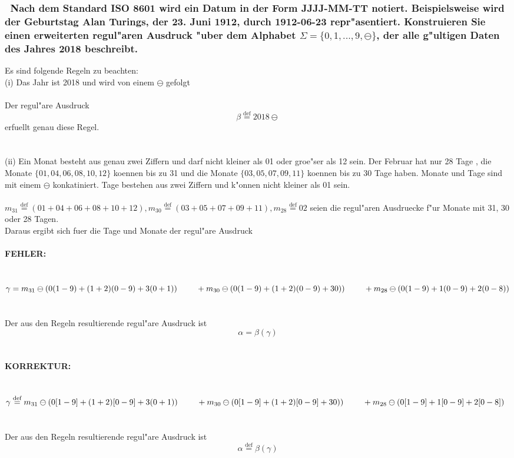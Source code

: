 \documentclass{article}
\newcommand{\tab}{\null\ \qquad}
\newcommand{\gap}{\null\ \\ \\}
\newcommand{\task}[1]{\textbf{#1} \\ \gap}
\newcommand{\error}{\task{FEHLER:}}
\newcommand{\correction}{\task{KORREKTUR:}}
\newcommand{\mdef}{\overset{\text{def}}{=}}
\begin{document}
\subsubsection{\
    Nach dem Standard ISO 8601 wird ein Datum in der Form JJJJ-MM-TT notiert.
        Beispielsweise wird der Geburtstag Alan Turings, der 23. Juni 1912, 
        durch 1912-06-23 repr"asentiert. Konstruieren Sie einen erweiterten 
        regul"aren Ausdruck "uber dem Alphabet $\Sigma = \{0,1,...,9, \ominus\}$,
        der alle g"ultigen Daten des Jahres 2018 beschreibt.
    }
Es sind folgende Regeln zu beachten:\\
(i) Das Jahr ist 2018 und wird von einem $\ominus$ gefolgt\\
\\
Der regul"are Ausdruck\[
    \beta \mdef 2018 \ominus
    \]
erfuellt genau diese Regel.\\
\gap
(ii) Ein Monat besteht aus genau zwei Ziffern und darf nicht kleiner als 01 oder
    groe"ser als 12 sein. Der Februar hat nur 28 Tage
    , die Monate $\{01,04,06,08,10,12\}$ koennen bis zu 31 
    und die Monate $\{03,05,07,09,11\}$ koennen bis zu 30 Tage haben.
    Monate und Tage sind mit einem $\ominus$ konkatiniert.
    Tage bestehen aus zwei Ziffern und k"onnen nicht kleiner als 01 sein.\\
\\
$m_{31} \mdef (01+04+06+08+10+12)
    , m_{30} \mdef (03+05+07+09+11)
    , m_{28} \mdef 02$ 
    seien die regul"aren Ausdruecke f"ur Monate mit 31, 30 oder 28 Tagen.\\
Daraus ergibt sich fuer die Tage und Monate der regul"are Ausdruck\\
\\
\error
$\gamma = m_{31} \ominus (0(1-9)+(1+2)(0-9)+3(0+1))\\
    \tab + m_{30} \ominus (0(1-9)+(1+2)(0-9)+30))\\
    \tab + m_{28} \ominus (0(1-9)+1(0-9)+2(0-8))
    $\\
\gap
Der aus den Regeln resultierende regul"are Ausdruck ist\[
    \alpha = \beta (\gamma)
    \]
\gap
\correction
$\gamma \mdef m_{31} \ominus (0[1-9]+(1+2)[0-9]+3(0+1))\\
    \tab + m_{30} \ominus (0[1-9]+(1+2)[0-9]+30))\\
    \tab + m_{28} \ominus (0[1-9]+1[0-9]+2[0-8])
    $\\
\gap
Der aus den Regeln resultierende regul"are Ausdruck ist\[
    \alpha \mdef \beta (\gamma)
    \]
\end{document}
